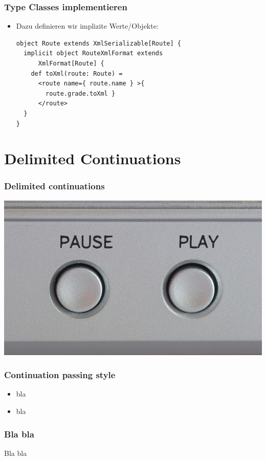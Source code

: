 \documentclass{beamer}
\begin{document}
\begin{frame}[fragile]
  \frametitle{Type Classes implementieren}
  \begin{itemize}
    \item Dazu definieren wir implizite Werte/Objekte:
    \begin{lstlisting}
object Route extends XmlSerializable[Route] {
  implicit object RouteXmlFormat extends
      XmlFormat[Route] {
    def toXml(route: Route) =
      <route name={ route.name } >{
        route.grade.toXml }
      </route>
  }
}
    \end{lstlisting}
  \end{itemize}
\end{frame}


\section{Delimited Continuations}

\begin{frame}
  \frametitle{Delimited continuations}
  \includegraphics[width=\linewidth]{img/continue.jpg}
\end{frame}

\begin{frame}
  \frametitle{Continuation passing style}
  \begin{itemize}
    \item bla
    \item bla
  \end{itemize}
\end{frame}

\begin{frame}
  \frametitle{Bla bla}
  Bla bla
\end{frame}
\end{document}
